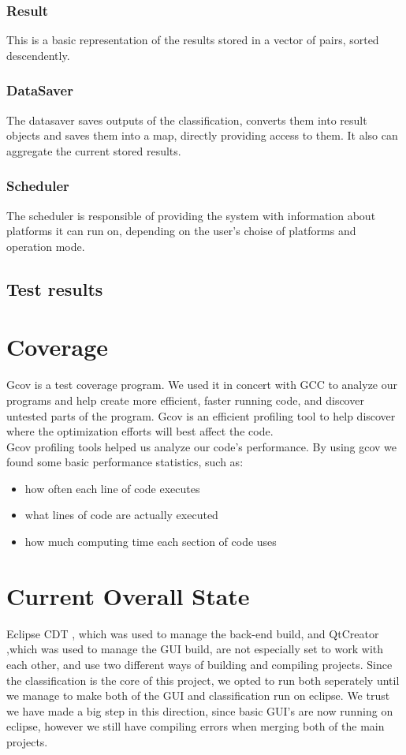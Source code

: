 \documentclass[parskip=full]{scrartcl}
\begin{document}
\subsubsection{Result}
This is a basic representation of the results stored in a vector of pairs, sorted descendently.
\subsubsection{DataSaver}
The datasaver saves outputs of the classification, converts them into result objects and saves them into a map, directly providing access to them. It also can aggregate the current stored results.
\subsubsection{Scheduler}
The scheduler is responsible of providing the system with information about platforms it can run on, depending on the user's choise of platforms and operation mode.
\pagebreak
\subsection {Test results}
\pagebreak
\section {Coverage}
Gcov is a test coverage program. We used it in concert with GCC to analyze our programs and help create more efficient, faster running code, and discover untested parts of the program. Gcov is an efficient profiling tool to help discover where the optimization efforts will best affect the code.\\
Gcov profiling tools helped us analyze our code's performance. By using gcov we found some basic performance statistics, such as:
\begin{itemize}
	\item how often each line of code executes
	\item what lines of code are actually executed
	\item how much computing time each section of code uses
\end {itemize}
\pagebreak
\section {Current Overall State}
Eclipse CDT , which was used to manage the back-end build, and QtCreator ,which was used to manage the GUI build, are not especially set to work with each other, and use two different ways of building and compiling projects.
Since the classification is the core of this project, we opted to run both seperately until we manage to make both of the GUI and classification run on eclipse. We trust we have made a big step in this direction, since basic GUI's are now running on eclipse, however we still have compiling errors when merging both of the main projects.
\end{document}
